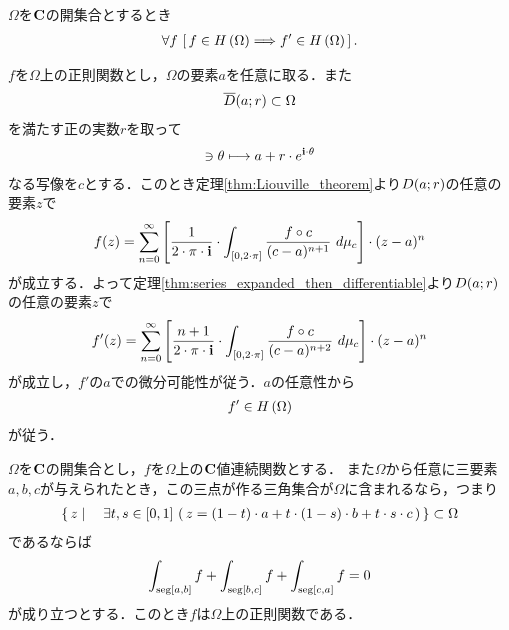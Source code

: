 	\begin{screen}
		\begin{thm}[正則関数の導関数も正則]\label{thm:derivative_of_holomorphic_function_is_holomorphic}
			$\Omega$を$\mathbf{C}$の開集合とするとき
			\begin{align}
				\forall f\, \left[\, f \in H\left(\Omega\right) \Longrightarrow f' \in H\left(\Omega\right)\, \right].
			\end{align}
		\end{thm}
	\end{screen}
	
	\begin{sketch}
		$f$を$\Omega$上の正則関数とし，$\Omega$の要素$a$を任意に取る．また
		\begin{align}
			\overline{D}(a;r) \subset \Omega
		\end{align}
		を満たす正の実数$r$を取って
		\begin{align}
			[0,2\cdot\pi] \ni \theta \longmapsto a + r \cdot e^{\isym \cdot \theta}
		\end{align}
		なる写像を$c$とする．このとき定理\ref{thm:Liouville_theorem}より$D(a;r)$の任意の要素$z$で
		\begin{align}
			f(z) = \sum_{n=0}^{\infty} \left[ \frac{1}{2\cdot\pi\cdot\mathbf{i}} \cdot \int_{[0,2\cdot\pi]} \frac{f \circ c}{(c - a)^{n+1}}\ d\mu_{c} \right] \cdot (z-a)^{n}
		\end{align}
		が成立する．よって定理\ref{thm:series_expanded_then_differentiable}より$D(a;r)$の任意の要素$z$で
		\begin{align}
			f'(z) = \sum_{n=0}^{\infty} \left[ \frac{n+1}{2\cdot\pi\cdot\mathbf{i}} \cdot \int_{[0,2\cdot\pi]} \frac{f \circ c}{(c - a)^{n+2}}\ d\mu_{c} \right] \cdot (z-a)^{n}
		\end{align}
		が成立し，$f'$の$a$での微分可能性が従う．$a$の任意性から
		\begin{align}
			f' \in H\left(\Omega\right)
		\end{align}
		が従う．
		\QED
	\end{sketch}
	
	\begin{screen}
		\begin{thm}[Moreraの定理]
			$\Omega$を$\mathbf{C}$の開集合とし，$f$を$\Omega$上の$\mathbf{C}$値連続関数とする．
			また$\Omega$から任意に三要素$a,b,c$が与えられたとき，この三点が作る三角集合が$\Omega$に含まれるなら，つまり
			\begin{align}
				\left\{\, z \mid \quad \exists t,s \in [0,1]\, 
				\left(\, z = (1-t) \cdot a 
				+ t \cdot (1-s) \cdot b 
				+ t \cdot s \cdot c\, \right)\, \right\}
				\subset \Omega
			\end{align}
			であるならば
			\begin{align}
				\int_{\operatorname{seg}[a,b]} f + \int_{\operatorname{seg}[b,c]} f + \int_{\operatorname{seg}[c,a]} f = 0
			\end{align}
			が成り立つとする．このとき$f$は$\Omega$上の正則関数である．
		\end{thm}
	\end{screen}
	
